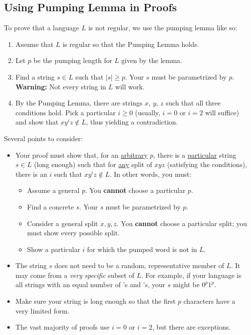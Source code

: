 \documentclass[letterpaper]{article}
\begin{document}
\subsection{Using Pumping Lemma in Proofs}
To prove that a language $L$ is not regular, we use the pumping lemma like so: 
\begin{enumerate}
    \item Assume that $L$ is regular so that the Pumping Lemma holds.
    \item Let $p$ be the pumping length for $L$ given by the lemma.
    \item Find a string $s \in L$ such that $|s| \geq p$. Your $s$ must be parametrized by $p$. \textbf{Warning:} Not every string in $L$ will work. 
    \item By the Pumping Lemma, there are strings $x$, $y$, $z$ such that all three conditions hold. Pick a particular $i \geq 0$ (usually, $i = 0$ or $i = 2$ will suffice) and show that $xy^i z \notin L$, thus yielding a contradiction. 
\end{enumerate}
Several points to consider:
\begin{itemize}
    \item Your proof must show that, for an \underline{arbitrary} $p$, there is a \underline{particular} string $s \in L$ (long enough) such that for \underline{any} split of $xyz$ (satisfying the conditions), there is an $i$ such that $xy^i z \notin L$. In other words, you must: 
    \begin{itemize}
        \item Assume a general $p$. You \textbf{cannot} choose a particular $p$.
        \item Find a concrete $s$. Your $s$ must be parametrized by $p$.
        \item Consider a general split $x, y, z$. You \textbf{cannot} choose a particular split; you must show every possible split.
        \item Show a particular $i$ for which the pumped word is not in $L$.  
    \end{itemize}
    \item The string $s$ does not need to be a random, representative member of $L$. It may come from a \emph{very specific} subset of $L$. For example, if your language is all strings with an equal number of 's and 's, your $s$ might be $0^p 1^p$.
    \item Make sure your string is long enough so that the first $p$ characters have a very limited form. 
    \item The vast majority of proofs use $i = 0$ or $i = 2$, but there are exceptions. 
\end{itemize}
\end{document}
